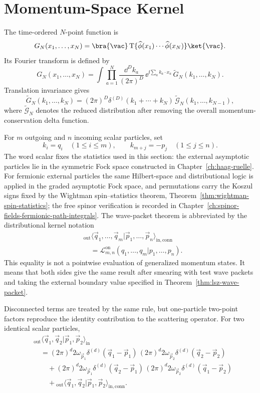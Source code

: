 \section{Momentum-Space Kernel}
\label{sec:lsz-momentum-space-kernel}

The time-ordered \(N\)-point function is
\[
  G_N(x_1,\ldots,x_N)
  =
  \bra{\vac}
  \operatorname T\{
    \widehat\phi(x_1)\cdots\widehat\phi(x_N)
  \}
  \ket{\vac} .
\]
Its Fourier transform is defined by
\[
  G_N(x_1,\ldots,x_N)
  =
  \int
  \prod_{a=1}^N\frac{\dd^D k_a}{(2\pi)^D}\,
  \ee^{\ii\sum_a k_a\cdot x_a}\,
  \widetilde G_N(k_1,\ldots,k_N).
\]
Translation invariance gives
\[
  \widetilde G_N(k_1,\ldots,k_N)
  =
  (2\pi)^D\delta^{(D)}(k_1+\cdots+k_N)\,
  \widetilde{\mathcal G}_N(k_1,\ldots,k_{N-1}),
\]
where \(\widetilde{\mathcal G}_N\) denotes the reduced distribution after
removing the overall momentum-conservation delta function.

For \(m\) outgoing and \(n\) incoming scalar particles, set
\[
  k_i=q_i\quad (1\le i\le m),
  \qquad
  k_{m+j}=-p_j\quad (1\le j\le n).
\]
The word scalar fixes the statistics used in this section: the external
asymptotic particles lie in the symmetric Fock space constructed in
Chapter~\ref{ch:haag-ruelle}.  For fermionic external particles the
same Hilbert-space and distributional logic is applied in the graded
asymptotic Fock space, and permutations carry the Koszul signs fixed by the
Wightman spin--statistics theorem,
Theorem~\ref{thm:wightman-spin-statistics}; the free spinor verification is
recorded in
Chapter~\ref{ch:spinor-fields-fermionic-path-integrals}.
The wave-packet theorem is abbreviated by the distributional kernel notation
\[
\begin{aligned}
&{}_{\mathrm{out}}\langle
  \vec q_1,\ldots,\vec q_m
  |\vec p_1,\ldots,\vec p_n
  \rangle_{\mathrm{in,conn}}
\\
&\quad =
  \mathcal L_{m,n}^{\mathrm{on}}
  (q_1,\ldots,q_m|p_1,\ldots,p_n).
\end{aligned}
\]
This equality is not a pointwise evaluation of generalized momentum states. It
means that both sides give the same result after smearing with test wave
packets and taking the external boundary value specified in
Theorem~\ref{thm:lsz-wave-packet}.

Disconnected terms are treated by the same rule, but one-particle two-point
factors reproduce the identity contribution to the scattering operator. For
two identical scalar particles,
\[
\begin{aligned}
&{}_{\mathrm{out}}\langle
  \vec q_1,\vec q_2
  |\vec p_1,\vec p_2
  \rangle_{\mathrm{in}}
\\
&\quad =
  (2\pi)^d2\omega_{\vec p_1}\delta^{(d)}(\vec q_1-\vec p_1)\,
  (2\pi)^d2\omega_{\vec p_2}\delta^{(d)}(\vec q_2-\vec p_2)
\\
&\qquad+
  (2\pi)^d2\omega_{\vec p_1}\delta^{(d)}(\vec q_2-\vec p_1)\,
  (2\pi)^d2\omega_{\vec p_2}\delta^{(d)}(\vec q_1-\vec p_2)
\\
&\qquad+
  {}_{\mathrm{out}}\langle
  \vec q_1,\vec q_2
  |\vec p_1,\vec p_2
  \rangle_{\mathrm{in,conn}} .
\end{aligned}
\]

